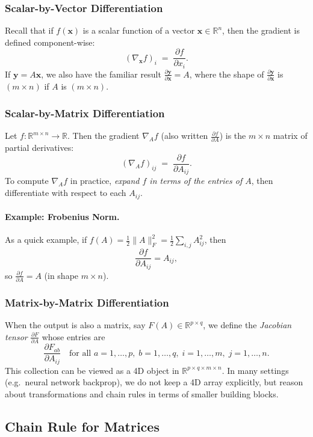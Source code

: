 \documentclass[11pt]{article}
\newcommand{\R}{\mathbb{R}}
\begin{document}
\subsubsection{Scalar-by-Vector Differentiation}
Recall that if $f(\mathbf{x})$ is a scalar function of a vector $\mathbf{x} \in \R^n$, 
then the gradient is defined component-wise:
\[
(\nabla_{\mathbf{x}} f)_i \;=\; \frac{\partial f}{\partial x_i}.
\]
If $\mathbf{y} = A \mathbf{x}$, we also have the familiar result 
$\frac{\partial \mathbf{y}}{\partial \mathbf{x}} = A$, 
where the shape of $\frac{\partial \mathbf{y}}{\partial \mathbf{x}}$ is $(m \times n)$ if $A$ is $(m \times n)$.

\subsubsection{Scalar-by-Matrix Differentiation}
Let $f : \R^{m \times n} \to \R$. 
Then the gradient $\nabla_A f$ (also written $\frac{\partial f}{\partial A}$) 
is the $m \times n$ matrix of partial derivatives:
\[
(\nabla_A f)_{ij} 
\;=\; 
\frac{\partial f}{\partial A_{ij}}.
\]
To compute $\nabla_A f$ in practice, 
\emph{expand $f$ in terms of the entries of $A$}, 
then differentiate with respect to each $A_{ij}$. 

\paragraph{Example: Frobenius Norm.}
As a quick example, if $f(A) = \frac12 \|A\|_F^2 = \frac12 \sum_{i,j} A_{ij}^2$, 
then 
\[
\frac{\partial f}{\partial A_{ij}} = A_{ij},
\]
so $\frac{\partial f}{\partial A} = A$ (in shape $m \times n$).

\subsubsection{Matrix-by-Matrix Differentiation}

When the output is also a matrix, say $F(A) \in \R^{p \times q}$, 
we define the \emph{Jacobian tensor} $\frac{\partial F}{\partial A}$ 
whose entries are 
\[
\frac{\partial F_{ab}}{\partial A_{ij}}
\quad
\text{for all } a=1,\dots,p,\; b=1,\dots,q,\; i=1,\dots,m,\; j=1,\dots,n.
\]
This collection can be viewed as a 4D object in $\R^{p \times q \times m \times n}$. 
In many settings (e.g.\ neural network backprop), we do not keep a 4D array explicitly, 
but reason about transformations and chain rules in terms of smaller building blocks.

\subsection{Chain Rule for Matrices}
\label{sec:chainrule}
\end{document}

